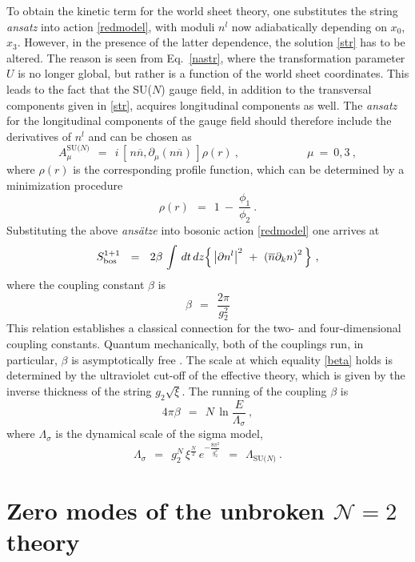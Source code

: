 \documentclass[12pt]{article}
\def\beq{\begin{equation}}
\def\eeq{\end{equation}}
\newcommand{\ntwo}{${\mathcal N}=2$ }
\newcommand{\p}{\partial}
\newcommand{\ov}{\overline}
\newcommand{\LN}{\Lambda_\text{SU($N$)}}
\newcommand{\nbar}{\ov{n}}
\begin{document}
	To obtain the kinetic term for the world sheet theory, one substitutes the string {\it ansatz}
	into action \eqref{redmodel}, with moduli $ n^l $ now adiabatically
	depending on $ x_0 $, $ x_3 $.
	However, in the presence of the latter dependence, the solution \eqref{str} has to be altered.
	The reason is seen from Eq.~\eqref{nastr}, where the transformation parameter 
	$ U $ is no longer global, but rather is a function of the world sheet coordinates.
	This leads to the fact that the SU($N$) gauge field, in addition to the transversal components
	given in \eqref{str}, acquires longitudinal components as well.
	The {\it ansatz} for the longitudinal components of the gauge field should
	therefore include the derivatives of $ n^l $ and can be chosen as 
\[
	A_\mu^\text{SU($N$)} ~~=~~ i\, \left[\, n\nbar, \p_\mu(n\nbar)\, \right] \rho(r)~,   \qquad\qquad\qquad \mu~=~0, 3~,
\]
	where $ \rho(r) $ is the corresponding profile function, which can be determined by
	a minimization procedure \cite{SYrev}
\[
	\rho(r) ~~=~~ 1 ~-~ \frac{\phi_1}{\phi_2}~.
\]
	Substituting the above {\it ans\"{a}tze} into bosonic action \eqref{redmodel} one arrives
	at
\begin{align}
\label{cp}
	S_{\rm bos}^{1+1} ~~=~~ 2\beta\, \int\, dt\,dz 
					\Bigl\{\, \left|\p n^l\right|^2    
						  ~+~  \left(\nbar \p_k n\right)^2\,
					\Bigr\}~,
\end{align}
	where the coupling constant $ \beta $ is 
\beq
\label{beta}
	\beta ~~=~~ \frac{2\pi}{g_2^2}
\eeq
	This relation establishes a classical connection for the two- and four-dimensional
	 coupling constants.
	Quantum mechanically, both of the couplings run, in particular, $ \beta $ is asymptotically
	free \cite{P75}.
	The scale at which equality \eqref{beta} holds is determined by the ultraviolet cut-off
	of the effective theory, which is given by the inverse thickness of the string $ g_2 \sqrt{\xi} $.
	The running of the coupling $ \beta $ is 
\beq
\label{asyfree}
	4 \pi \beta ~~=~~ N\,  \ln \frac{E}{\Lambda_\sigma}~,
\eeq
	where $ \Lambda_\sigma $ is the dynamical scale of the sigma model, 
\beq
\label{lambdasig}
	\Lambda_\sigma ~~=~~ g_2^N\, \xi^{\frac{N}{2}}\, e^{-\frac{8\pi^2}{g_2^2}} ~~=~~ \LN~.
\eeq


%
%
\section{Zero modes of the unbroken \boldmath\ntwo theory}
\label{zeromodes}
\setcounter{equation}{0}
\end{document}
